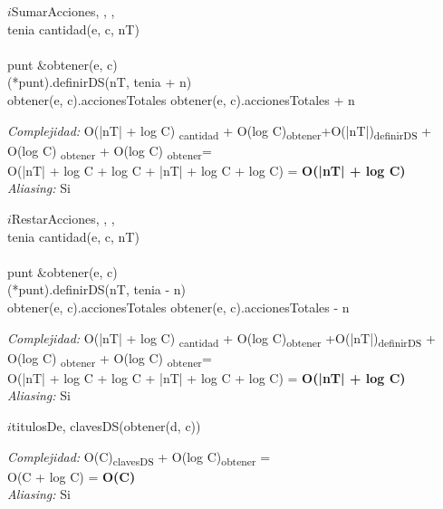 \begin{algorithm}{$i$SumarAcciones}{, , , }{}
				 \\
				tenia \leftarrow cantidad(e, c, nT)\\
				 \\
				punt \leftarrow \&obtener(e, c)\\
				(*punt).definirDS(nT, tenia + n)\\
				obtener(e, c).accionesTotales \leftarrow obtener(e, c).accionesTotales + n	
			\end{algorithm}	
			\textit{Complejidad:} O(|nT| + log C) \textsubscript{cantidad} + O(log C)\textsubscript{obtener}+O(|nT|)\textsubscript{definirDS} + \\ O(log C) \textsubscript{obtener} + O(log C) \textsubscript{obtener}=\\
			O(|nT| + log C + log C + |nT| + log C + log C) =\textbf{ O(|nT| + log C)}\\
	\textit{Aliasing:} Si \\
								

\begin{algorithm}{$i$RestarAcciones}{, , , }{}
				 \\
				tenia \leftarrow cantidad(e, c, nT)\\
				 \\
				punt \leftarrow \&obtener(e, c)\\
				(*punt).definirDS(nT, tenia - n)\\
				obtener(e, c).accionesTotales \leftarrow obtener(e, c).accionesTotales - n	
			\end{algorithm}	
			\textit{Complejidad:} O(|nT| + log C) \textsubscript{cantidad} 
			+ O(log C)\textsubscript{obtener}
			+O(|nT|)\textsubscript{definirDS}
			+ \\ O(log C) \textsubscript{obtener} 
			+ O(log C) \textsubscript{obtener}=\\
			O(|nT| + log C + log C + |nT| + log C + log C) =\textbf{ O(|nT| + log C)}\\
	\textit{Aliasing:} Si \\
			
\begin{algorithm}{$i$titulosDe}{, }{}
			\RETURN clavesDS(obtener(d, c))
			\end{algorithm}	
			\textit{Complejidad:} O(C)\textsubscript{clavesDS} + O(log C)\textsubscript{obtener} =\\
			O(C + log C) = \textbf{O(C)} \\
	\textit{Aliasing:} Si \\
			
